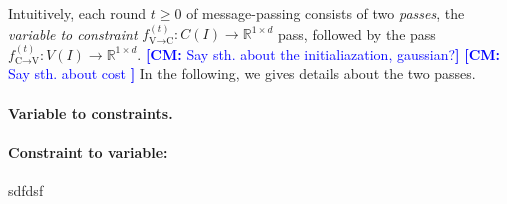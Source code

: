 \documentclass[11pt, DIV=12]{scrartcl}
\theoremstyle{definition}
\newcommand{\new}[1]{\emph{#1}}
\newcommand{\RR}{\mathbb{R}}
\newcommand{\cm}[1]{{{\textcolor{blue}{\textbf{[CM:} {#1}\textbf{]}}}}}
\begin{document}
Intuitively, each round $t \geq 0$ of message-passing consists of two \emph{passes}, the \new{variable to constraint} $f^{(t)}_{\text{V$\to$C}}\colon C(I) \to \RR^{1\times d}$ pass, followed by the  pass $f^{(t)}_{\text{C$\to$V}}\colon V(I) \to \RR^{1\times d}$. 
\cm{Say sth. about the initialiazation, gaussian?}
\cm{Say sth. about cost }
In the following, we gives details about the two passes. 



\paragraph{Variable to constraints.} 


\paragraph{Constraint to variable:} sdfdsf
\end{document}
